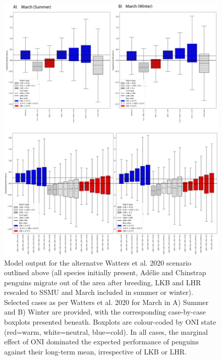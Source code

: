 \documentclass[]{elsarticle} %
\begin{document}
\begin{figure}

\includegraphics[width=1\linewidth]{./Watters EMM figures/All spp summer then winter 37} \hfill{}

\caption{Model output for the alternatve Watters et al. 2020 scenario outlined above (all species initially present, Adélie and Chinstrap penguins migrate out of the area after breeding, LKB and LHR rescaled to SSMU and March included in summer or winter).   Selected cases as per Watters et al. 2020 for March in A) Summer and B) Winter are provided, with the corresponding case-by-case boxplots presented beneath.  Boxplots are colour-coded by ONI state (red=warm, white=neutral, blue=cold).  In all cases, the marginal effect of ONI dominated the expected performance of penguins against their long-term mean, irrespective of LKB or LHR.}\label{fig:Scenario plot 1}
\end{figure}
\end{document}
